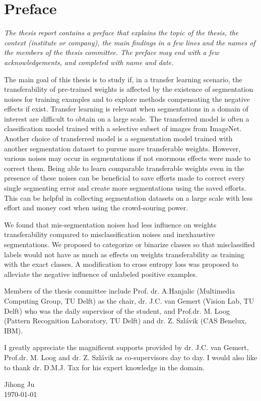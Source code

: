 \section{Preface}
\label{sec:preface}

\noindent \textit{The thesis report contains a preface that explains the topic of the thesis, the context (institute or company), the main findings in a few lines and the names of the members of the thesis committee. The preface may end with a few acknowledgements, and completed with name and date.}

The main goal of this thesis is to study if, in a transfer learning scenario, the transferability of pre-trained weights is affected by the existence of segmentation noises for training examples and to explore methods compensating the negative effects if exist.
Transfer learning is relevant when segmentations in a domain of interest are difficult to obtain on a large scale.
The transferred model is often a classification model trained with a selective subset of images from ImageNet.
Another choice of transferred model is a segmentation model trained with another segmentation dataset to pursue more transferable weights.
However, various noises may occur in segmentations if not enormous effects were made to correct them.
Being able to learn comparable transferable weights even in the presence of these noises can be beneficial to save efforts made to correct every single segmenting error and create more segmentations using the saved efforts.
This can be helpful in collecting segmentation datasets on a large scale with less effort and money cost when using the crowd-souring power.

We found that mis-segmentation noises had less influence on weights transferability compared to misclassification noises and inexhaustive segmentations.
We proposed to categorize or binarize classes so that misclassified labels would not have as much as effects on weights transferability as training with the exact classes.
A modification to cross entropy loss was proposed to alleviate the negative influence of unlabeled positive examples.

Members of the thesis committee include Prof. dr. A.Hanjalic (Multimedia Computing Group, TU Delft) as the chair, dr. J.C. van Gemert (Vision Lab, TU Delft) who was the daily supervisor of the student, and Prof.dr. M. Loog  (Pattern Recognition Laboratory, TU Delft) and dr. Z. Szlávik (CAS Benelux, IBM).

I greatly appreciate the magnificent supports provided by dr. J.C. van Gemert, Prof.dr. M. Loog and dr. Z. Szlávik as co-supervisors day to day.
I would also like to thank dr. D.M.J. Tax for his expert knowledge in the domain.

\begin{flushright}
Jihong Ju\\
\today
\end{flushright}
